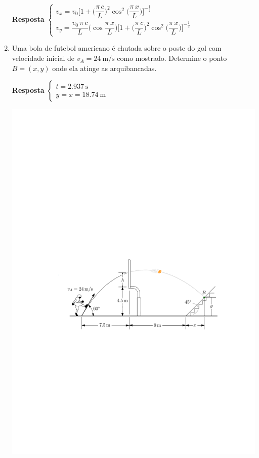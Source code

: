 \documentclass[a4paper,12pt]{article}
\begin{document}
\begin{enumerate}
		\textbf{Resposta}
		$
		\begin{cases}
		v_{x}=v_{0}\bigg[1+\bigg(\dfrac{\pi\,c}{L}\bigg)^{2}\cos^{2}\bigg(\dfrac{\pi\,x}{L}\bigg)\bigg]^{-\frac{1}{2}}\\
		v_{y}=\dfrac{v_{0}\,\pi\,c}{L}\bigg(\cos\dfrac{\pi\,x}{L}\bigg)\bigg[1+\bigg(\dfrac{\pi\,c}{L}\bigg)^{2}\cos^{2}\bigg(\dfrac{\pi\,x}{L}\bigg)\bigg]^{-\frac{1}{2}}
		\end{cases}
		$
		
		
		\item Uma bola de futebol americano é chutada sobre o poste do gol com velocidade inicial de $v_{A}=\SI{24}{\meter/\second}$ como mostrado. Determine o ponto $B=(x,y)$ onde ela atinge as arquibancadas.
		
		\textbf{Resposta}
		$
		\begin{cases}
		t=\SI{2.937}{\second}\\
		y=x=\SI{18.74}{\meter}
		\end{cases}
		$
		\vspace{-1cm}
		\begin{flushright}
			\includegraphics[scale=1.1]{images/draw_10}
		\end{flushright}
		

\end{enumerate}
\end{document}

